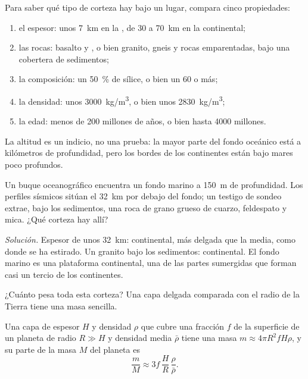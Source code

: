\begin{method}\label{met:g12:continental-crust:compare}
Para saber qué tipo de corteza hay bajo un lugar, compara cinco propiedades:
\begin{enumerate}
  \item el espesor: unos \qty{7}{km} en la , de 30 a
        \qty{70}{km} en la continental;
  \item las rocas: basalto y , o bien granito, gneis y rocas
        emparentadas, bajo una cobertera de sedimentos;
  \item la composición: un \qty{50}{\percent} de sílice, o bien un 60 o
        más;
  \item la densidad: unos \qty{3000}{kg/m^3}, o bien unos \qty{2830}{kg/m^3};
  \item la edad: menos de 200 millones de años, o bien hasta 4000 millones.
\end{enumerate}
La altitud es un indicio, no una prueba: la mayor parte del fondo oceánico
está a kilómetros de profundidad, pero los bordes de los continentes están
bajo mares poco profundos.
\end{method}

\begin{example}\label{ex:g12:continental-crust:shelf}
Un buque oceanográfico encuentra un fondo marino a \qty{150}{m} de
profundidad. Los perfiles sísmicos sitúan el  \qty{32}{km} por debajo del
fondo; un testigo de sondeo extrae, bajo los sedimentos, una roca de grano
grueso de cuarzo, feldespato y mica. ¿Qué corteza hay allí?

\emph{Solución.} Espesor de unos \qty{32}{km}: continental, más delgada que la
media, como donde se ha estirado. Un granito bajo los sedimentos:
continental. El fondo marino es una plataforma continental, una de las partes
sumergidas que forman casi un tercio de los continentes.
\end{example}

¿Cuánto pesa toda esta corteza? Una capa delgada comparada con el radio de
la Tierra tiene una masa sencilla.

\begin{proposition}\label{prop:g12:continental-crust:thin-layer}
Una capa de espesor $H$ y densidad $\rho$ que cubre una fracción $f$ de la
superficie de un planeta de radio $R \gg H$ y densidad media $\bar\rho$ tiene
una masa $m \approx 4\pi R^2 f H \rho$, y su parte de la masa $M$ del planeta
es
\[
  \frac{m}{M} \approx 3 f\,\frac{H}{R}\,\frac{\rho}{\bar\rho}.
\]
\end{proposition}


